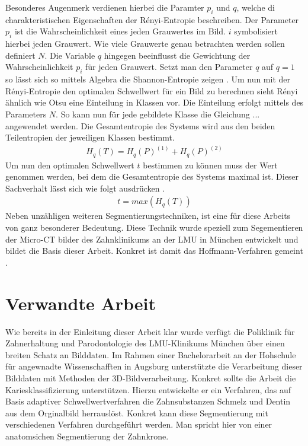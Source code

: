Besonderes Augenmerk verdienen hierbei die Paramter $p_{i}$ und $q$, welche di charakteristischen
Eigenschaften der Rényi-Entropie beschreiben. Der Parameter $p_{i}$ ist die
Wahrscheinlichkeit eines jeden Grauwertes im Bild. $i$ symbolisiert hierbei jeden
Grauwert. Wie viele Grauwerte genau betrachten werden sollen definiert $N$. Die Variable
$q$ hingegen beeinflusst die Gewichtung der Wahrscheinlichkeit $p_{i}$ für jeden
Grauwert. Setzt man den Parameter $q$ auf $q = 1$ so lässt sich so mittels
Algebra die Shannon-Entropie zeigen \citep[vgl.][K.2]{bromiley2004}. Um nun mit
der Rényi-Entropie den optimalen Schwellwert für ein Bild zu berechnen sieht
Rényi ähnlich wie Otsu eine Einteilung in Klassen vor. Die Einteilung erfolgt mittels
des Parameters $N$. So kann nun für jede gebildete Klasse die Gleichung ...
angewendet werden. Die Gesamtentropie des Systems wird aus den beiden Teilentropien
der jeweiligen Klassen bestimmt\citep[vgl.][K. 2]{bromiley2004}.
\begin{align}
	H_{q}(T) = H_{q}(P)^{(1)}+ H_{q}(P)^{(2)}
\end{align}
Um nun den optimalen Schwellwert $t$ bestimmen zu können muss der Wert genommen
werden, bei dem die Gesamtentropie des Systems maximal ist. Dieser Sachverhalt
lässt sich wie folgt ausdrücken \citep[vgl.][K. 2]{bromiley2004}.
\begin{align}
	t = max(H_{q}(T))
\end{align}
Neben unzähligen weiteren Segmentierungstechniken, ist eine für diese Arbeits von
ganz besonderer Bedeutung. Diese Technik wurde speziell zum Segementieren der
Micro-CT bilder des Zahnklinikums an der LMU in München entwickelt und bildet
die Basis dieser Arbeit. Konkret ist damit das Hoffmann-Verfahren gemeint \citep[vgl.][]{hoffmann2020}.

\pagebreak

\section{Verwandte Arbeit}
\label{sec:verwwandte_arbeit} Wie bereits in der Einleitung dieser Arbeit klar wurde
verfügt die Poliklinik für Zahnerhaltung und Parodontologie des LMU-Klinikums München
über einen breiten Schatz an Bilddaten. Im Rahmen einer Bachelorarbeit an der
Hohschule für angewnadte Wissenschafften in Augsburg unterstützte \citet{hoffmann2020}
die Verarbeitung dieser Bilddaten mit Methoden der 3D-Bildverarbeitung. Konkret
sollte die Arbeit die Kariesklassifizierung unterstützen. Hierzu entwickelte er ein
Verfahren, das auf Basis adaptiver Schwellwertverfahren die Zahnsubstanzen
Schmelz und Dentin aus dem Orginalbild herrauslöst. Konkret kann diese Segmentierung
mit verschiedenen Verfahren durchgeführt werden. Man spricht hier von einer
anatomsichen Segmentierung der Zahnkrone.

